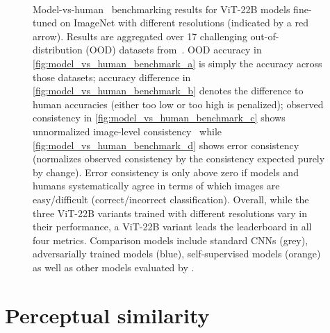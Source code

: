 \documentclass{article}
\begin{document}
\begin{figure}[ht]
    \centering
    \hspace{8pt}
     \\
    \hspace{8pt}
    \caption[]{Model-vs-human~\citep{geirhos2021partial} benchmarking results for ViT-22B models fine-tuned on ImageNet with different resolutions (indicated by a red arrow). Results are aggregated over 17 challenging out-of-distribution (OOD) datasets from~\citep{geirhos2021partial}. OOD accuracy in \cref{fig:model_vs_human_benchmark_a} is simply the accuracy across those datasets; accuracy difference in \cref{fig:model_vs_human_benchmark_b} denotes the difference to human accuracies (either too low or too high is penalized); observed consistency in \cref{fig:model_vs_human_benchmark_c} shows unnormalized image-level consistency~\citep[see][for details]{geirhos2021partial} while \cref{fig:model_vs_human_benchmark_d} shows error consistency (normalizes observed consistency by the consistency expected purely by change). Error consistency is only above zero if models and humans systematically agree in terms of which images are easy/difficult (correct/incorrect classification). Overall, while the three ViT-22B variants trained with different resolutions vary in their performance, a ViT-22B variant leads the leaderboard in all four metrics. Comparison models include standard CNNs (grey), adversarially trained models (blue), self-supervised models (orange) as well as other models evaluated by \citet{geirhos2021partial}.}
    \label{fig:model_vs_human_benchmark}
\end{figure}

\section{Perceptual similarity}
\label{app:perceptual_similarity}
\end{document}
